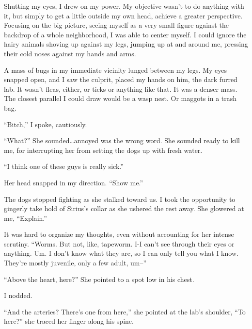Shutting my eyes, I drew on my power.  My objective wasn't to do anything with it, but simply to get a little outside my own head, achieve a greater perspective.  Focusing on the big picture, seeing myself as a very small figure against the backdrop of a whole neighborhood, I was able to center myself.  I could ignore the hairy animals shoving up against my legs, jumping up at and around me, pressing their cold noses against my hands and arms.



A mass of bugs in my immediate vicinity lunged between my legs.  My eyes snapped open, and I saw the culprit, placed my hands on him, the dark furred lab.  It wasn't fleas, either, or ticks or anything like that.  It was a denser mass.  The closest parallel I could draw would be a wasp nest.  Or maggots in a trash bag.



``Bitch,'' I spoke, cautiously.



``What?'' She sounded\ldots annoyed was the wrong word.  She sounded ready to kill me, for interrupting her from setting the dogs up with fresh water.



``I think one of these guys is really sick.''



Her head snapped in my direction.  ``Show me.''



The dogs stopped fighting as she stalked toward us.  I took the opportunity to gingerly take hold of Sirius's collar as she ushered the rest away.  She glowered at me, ``Explain.''



It was hard to organize my thoughts, even without accounting for her intense scrutiny.  ``Worms.  But not, like, tapeworm.  I-I can't see through their eyes or anything.  Um.  I don't know what they are, so I can only tell you what I know.  They're mostly juvenile, only a few adult, um--''



``Above the heart, here?''  She pointed to a spot low in his chest.



I nodded.



``And the arteries?  There's one from here,'' she pointed at the lab's shoulder, ``To here?'' she traced her finger along his spine.



